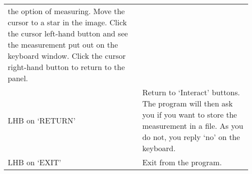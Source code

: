 {\begin{enumerate}
\begin{tabular}{p{1.2in}p{4.3in}}
                             the option of measuring. Move the cursor to
                             a star in the image. Click the cursor left-hand
                             button and see the measurement put out
                             on the keyboard window. Click the cursor
                             right-hand button to return to the panel. \\
           LHB on `RETURN' & Return to `Interact' buttons. The program
                             will then ask you if you want to store the
                             measurement in a file. As you do not, you
                             reply `no' on the keyboard. \\
           LHB on `EXIT'   & Exit from the program. \\
      \end{tabular}
 
 
\end{enumerate}
}

\newpage


